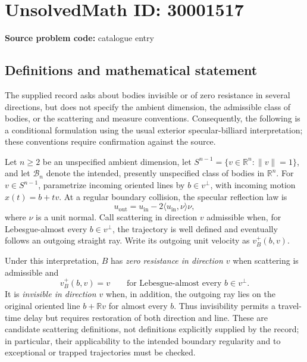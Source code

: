 \documentclass[11pt]{article}
\newcommand{\R}{\mathbb{R}}
\begin{document}
\section*{UnsolvedMath ID: 30001517}
\textbf{Source problem code:} catalogue entry
\subsection{Definitions and mathematical statement}
The supplied record asks about bodies invisible or of zero resistance in several directions, but does not specify the ambient dimension, the admissible class of bodies, or the scattering and measure conventions. Consequently, the following is a conditional formulation using the usual exterior specular-billiard interpretation; these conventions require confirmation against the source.

Let \(n\geq 2\) be an unspecified ambient dimension, let \(S^{n-1}=\{v\in\R^n:\|v\|=1\}\), and let \(\mathcal B_n\) denote the intended, presently unspecified class of bodies in \(\R^n\). For \(v\in S^{n-1}\), parametrize incoming oriented lines by \(b\in v^\perp\), with incoming motion \(x(t)=b+tv\). At a regular boundary collision, the specular reflection law is
\[
 u_{\mathrm{out}}=u_{\mathrm{in}}-2\langle u_{\mathrm{in}},\nu\rangle\nu,
\]
where \(\nu\) is a unit normal. Call scattering in direction \(v\) admissible when, for Lebesgue-almost every \(b\in v^\perp\), the trajectory is well defined and eventually follows an outgoing straight ray. Write its outgoing unit velocity as \(v_B^+(b,v)\).

Under this interpretation, \(B\) has \emph{zero resistance in direction \(v\)} when scattering is admissible and
\[
 v_B^+(b,v)=v\qquad\text{for Lebesgue-almost every }b\in v^\perp.
\]
It is \emph{invisible in direction \(v\)} when, in addition, the outgoing ray lies on the original oriented line \(b+\R v\) for almost every \(b\). Thus invisibility permits a travel-time delay but requires restoration of both direction and line. These are candidate scattering definitions, not definitions explicitly supplied by the record; in particular, their applicability to the intended boundary regularity and to exceptional or trapped trajectories must be checked.
\end{document}
